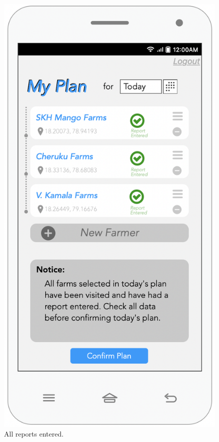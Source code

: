 \begin{multicols}{2}
\begin{figure}[H]
\centering
\includegraphics[scale=0.5]{../images_diagrams/mock_ups/dd/Plan08_AllReportsEntered.png}
\caption{\label{fig:mockplan_done}All reports entered.}
\end{figure}

\end{multicols}


